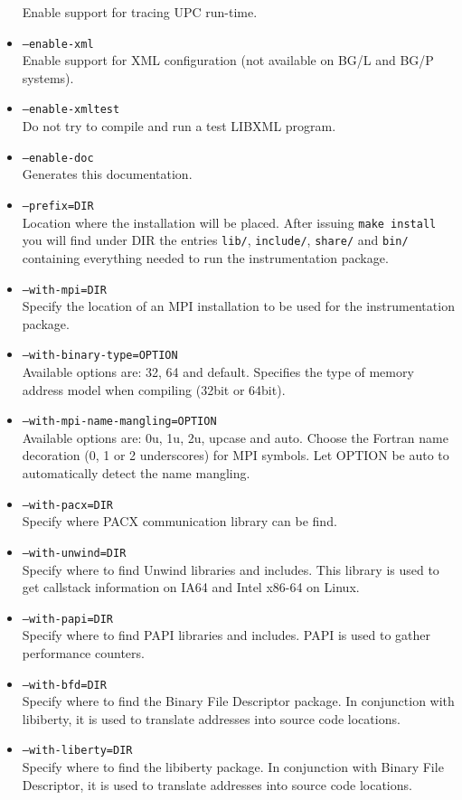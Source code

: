 \begin{itemize}
	Enable support for tracing UPC run-time.
	\item {\tt --enable-xml} \\
	Enable support for XML configuration (not available on BG/L and BG/P systems).
	\item {\tt --enable-xmltest} \\
	Do not try to compile and run a test LIBXML program.
	\item {\tt --enable-doc} \\
	Generates this documentation.
	\item {\tt --prefix=DIR} \\
	Location where the installation will be placed. After issuing {\tt make install} you will find under DIR the entries {\tt lib/}, {\tt include/}, {\tt share/} and {\tt bin/} containing everything needed to run the instrumentation package.
	\item {\tt --with-mpi=DIR} \\
	Specify the location of an MPI installation to be used for the instrumentation package.
	\item {\tt --with-binary-type=OPTION} \\
	Available options are: 32, 64 and default. Specifies the type of memory address model when compiling (32bit or 64bit).
	\item {\tt --with-mpi-name-mangling=OPTION} \\
	Available options are: 0u, 1u, 2u, upcase and auto. Choose the Fortran name decoration (0, 1 or 2 underscores) for MPI symbols. Let OPTION be auto to automatically detect the name mangling.
	\item {\tt --with-pacx=DIR} \\
	Specify where PACX communication library can be find.
	\item {\tt --with-unwind=DIR} \\
	Specify where to find Unwind libraries and includes. This library is used to get callstack information on IA64 and Intel x86-64 on Linux.
	\item {\tt --with-papi=DIR} \\
	Specify where to find PAPI libraries and includes. PAPI is used to gather performance counters.
	\item {\tt --with-bfd=DIR} \\
	Specify where to find the Binary File Descriptor package. In conjunction with libiberty, it is used to translate addresses into source code locations.
	\item {\tt --with-liberty=DIR} \\
	Specify where to find the libiberty package. In conjunction with Binary File Descriptor, it is used to translate addresses into source code locations.
\end{itemize}

